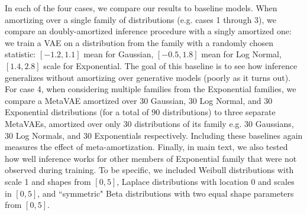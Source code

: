 In each of the four cases, we compare our results to baseline models. When amortizing over a single family of distributions (e.g. cases 1 through 3), we compare an doubly-amortized inference procedure with a singly amortized one: we train a VAE on a distribution from the family with a randomly chosen statistic: $[-1.2, 1.1]$ mean for Gaussian, $[-0.5, 1.8]$ mean for Log Normal, $[1.4, 2.8]$ scale for Exponential. The goal of this baseline is to see how inference generalizes without amortizing over generative models (poorly as it turns out). For case 4, when considering multiple families from the Exponential families, we compare a MetaVAE amortized over 30 Gaussian, 30 Log Normal, and 30 Exponential distributions (for a total of 90 distributions) to three separate MetaVAEs, amortized over only 30 distributions of its family e.g. 30 Gaussians, 30 Log Normals, and 30 Exponentials respectively. Including these baselines again measures the effect of meta-amortization. Finally, in main text, we also tested how well inference works for other members of Exponential family that were not observed during training. To be specific, we included Weibull distributions with scale 1 and shapes from $[0,5]$, Laplace distributions with location 0 and scales in $[0,5]$, and ``symmetric" Beta distributions with two equal shape parameters from $[0,5]$.

